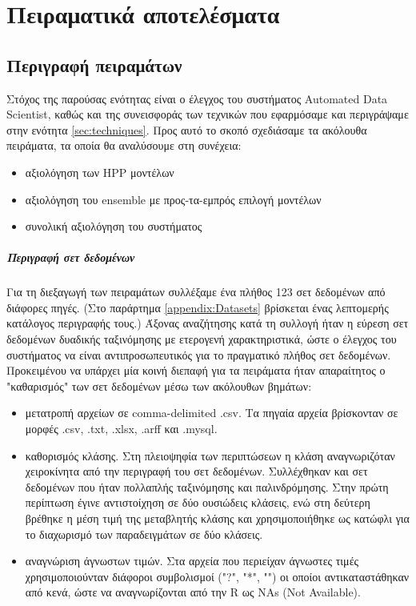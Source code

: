 \chapter{Πειραματικά αποτελέσματα}
\section{Περιγραφή πειραμάτων}
Στόχος της παρούσας ενότητας είναι ο έλεγχος του συστήματος Automated Data Scientist, καθώς και της συνεισφοράς των τεχνικών που εφαρμόσαμε και περιγράψαμε στην ενότητα \ref{sec:techniques}. Προς αυτό το σκοπό σχεδιάσαμε τα ακόλουθα πειράματα, τα οποία θα αναλύσουμε στη συνέχεια:
\begin{itemize}
	\item αξιολόγηση των HPP μοντέλων
	\item αξιολόγηση του ensemble με προς-τα-εμπρός επιλογή μοντέλων
	\item συνολική αξιολόγηση του συστήματος
\end{itemize}

\paragraph{Περιγραφή σετ δεδομένων} Για τη διεξαγωγή των πειραμάτων συλλέξαμε ένα πλήθος 123 σετ δεδομένων από διάφορες πηγές. (Στο παράρτημα \ref{appendix:Datasets} βρίσκεται ένας λεπτομερής κατάλογος περιγραφής τους.) Άξονας αναζήτησης κατά τη συλλογή ήταν η εύρεση σετ δεδομένων δυαδικής ταξινόμησης με ετερογενή χαρακτηριστικά, ώστε ο έλεγχος του συστήματος να είναι αντιπροσωπευτικός για το πραγματικό πλήθος σετ δεδομένων. Προκειμένου να υπάρχει μία κοινή διεπαφή για τα πειράματα ήταν απαραίτητος ο "καθαρισμός" των σετ δεδομένων μέσω των ακόλουθων βημάτων:
\begin{itemize}
	\item μετατροπή αρχείων σε comma-delimited .csv. Τα πηγαία αρχεία βρίσκονταν σε μορφές .csv, .txt, .xlsx, .arff και .mysql.
	\item καθορισμός κλάσης. Στη πλειοψηφία των περιπτώσεων η κλάση αναγνωριζόταν χειροκίνητα από την περιγραφή του σετ δεδομένων. Συλλέχθηκαν και σετ δεδομένων που ήταν πολλαπλής ταξινόμησης και παλινδρόμησης. Στην πρώτη περίπτωση έγινε αντιστοίχηση σε δύο ουσιώδεις κλάσεις, ενώ στη δεύτερη βρέθηκε η μέση τιμή της μεταβλητής κλάσης και χρησιμοποιήθηκε ως κατώφλι για το διαχωρισμό των παραδειγμάτων σε δύο κλάσεις.
	\item αναγνώριση άγνωστων τιμών. Στα αρχεία που περιείχαν άγνωστες τιμές χρησιμοποιούνταν διάφοροι συμβολισμοί ("?", "*", "") οι οποίοι αντικαταστάθηκαν από κενά, ώστε να αναγνωρίζονται από την R ως NAs (Not Available).  
\end{itemize}
